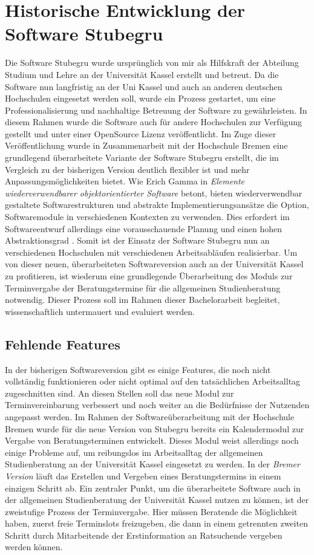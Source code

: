\section{Historische Entwicklung der Software Stubegru}
Die Software Stubegru wurde ursprünglich von mir als Hilfskraft der Abteilung
Studium und Lehre an der Universität Kassel erstellt und betreut. Da die
Software nun langfristig an der Uni Kassel und auch an anderen deutschen
Hochschulen eingesetzt werden soll, wurde ein Prozess gestartet, um eine
Professionalisierung und nachhaltige Betreuung der Software zu gewährleisten.
In diesem Rahmen wurde die Software auch für andere Hochschulen zur Verfügung
gestellt und unter einer OpenSource Lizenz veröffentlicht. Im Zuge dieser
Veröffentlichung wurde in Zusammenarbeit mit der Hochschule Bremen eine
grundlegend überarbeitete Variante der Software Stubegru erstellt, die im
Vergleich zu der bisherigen Version deutlich flexibler ist und mehr
Anpassungsmöglichkeiten bietet. Wie Erich Gamma in \textit{Elemente
    wiederverwendbarer objektorientierter Software} betont, bieten wiederverwendbar
gestaltete Softwarestrukturen und abstrakte Implementierungsansätze die Option,
Softwaremodule in verschiedenen Kontexten zu verwenden. Dies erfordert im
Softwareentwurf allerdings eine vorausschauende Planung und einen hohen
Abstraktionsgrad \cite{wiederverwSoftware}. Somit ist der Einsatz der Software
Stubegru nun an verschiedenen Hochschulen mit verschiedenen Arbeitsabläufen
realisierbar. Um von dieser neuen, überarbeiteten Softwareversion auch an der
Universität Kassel zu profitieren, ist wiederum eine grundlegende
Überarbeitung des Moduls zur Terminvergabe der Beratungstermine für die
allgemeinen Studienberatung notwendig. Dieser Prozess soll im Rahmen dieser
Bachelorarbeit begleitet, wissenschaftlich untermauert und evaluiert werden.

\subsection*{Fehlende Features}
In der bisherigen Softwareversion gibt es einige Features, die noch nicht
vollständig funktionieren oder nicht optimal auf den tatsächlichen
Arbeitsalltag zugeschnitten sind. An diesen Stellen soll das neue Modul zur
Terminvereinbarung verbessert und noch weiter an die Bedürfnisse der Nutzenden
angepasst werden. Im Rahmen der Softwareüberarbeitung mit der Hochschule Bremen
wurde für die neue Version von Stubegru bereits ein Kalendermodul zur Vergabe
von Beratungsterminen entwickelt. Dieses Modul weist allerdings noch einige
Probleme auf, um reibungslos im Arbeitsalltag der allgemeinen Studienberatung
an der Universität Kassel eingesetzt zu werden. In der \textit{Bremer Version} läuft
das Erstellen und Vergeben eines Beratungstermins in einem einzigen Schritt ab.
Ein zentraler Punkt, um die überarbeitete Software auch in der allgemeinen
Studienberatung der Universität Kassel nutzen zu können, ist der zweistufige
Prozess der Terminvergabe. Hier müssen Beratende die Möglichkeit haben, zuerst
freie Terminslots freizugeben, die dann in einem getrennten zweiten Schritt
durch Mitarbeitende der Erstinformation an Ratsuchende vergeben werden können.

